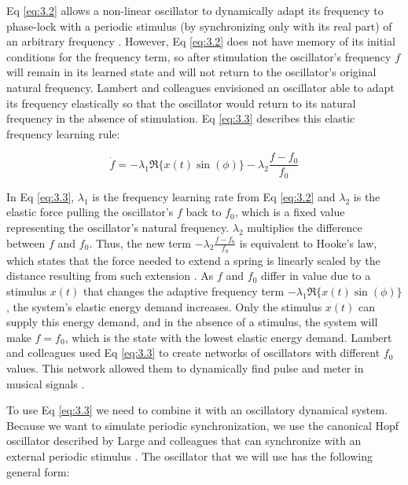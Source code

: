 \documentclass{report}
\begin{document}
Eq \eqref{eq:3.2} allows a non-linear oscillator to dynamically adapt its frequency to phase-lock with a periodic stimulus (by synchronizing only with its real part) of an arbitrary frequency \cite{righetti2006dynamic}. However, Eq \eqref{eq:3.2} does not have memory of its initial conditions for the frequency term, so after stimulation the oscillator's frequency $f$ will remain in its learned state and will not return to the oscillator's original natural frequency. Lambert and colleagues \cite{lambert2016adaptive} envisioned an oscillator able to adapt its frequency elastically so that the oscillator would return to its natural frequency in the absence of stimulation. Eq \eqref{eq:3.3} describes this elastic frequency learning rule:

\begin{equation}
\dot{f} = -\lambda_1 \Re \{ x(t) \sin(\phi) \} - \lambda_2 \frac{f-f_0}{f_0} \label{eq:3.3}
\end{equation}

In Eq \eqref{eq:3.3}, $\lambda_1$ is the frequency learning rate from Eq \eqref{eq:3.2} and $\lambda_2$ is the elastic force pulling the oscillator's $f$ back to $f_0$, which is a fixed value representing the oscillator's natural frequency. $\lambda_2$ multiplies the difference between $f$ and $f_0$. Thus, the new term $−\lambda_2 \frac{f-f_0}{f_0}$ is equivalent to Hooke's law, which states that the force needed to extend a spring is linearly scaled by the distance resulting from such extension \cite{lambert2016adaptive}. As $f$ and $f_0$ differ in value due to a stimulus $x(t)$ that changes the adaptive frequency term $-\lambda_1 \Re \{ x(t) \sin(\phi) \}$, the system's elastic energy demand increases. Only the stimulus $x(t)$ can supply this energy demand, and in the absence of a stimulus, the system will make $f = f_0$, which is the state with the lowest elastic energy demand. Lambert and colleagues \cite{lambert2016adaptive} used Eq \eqref{eq:3.3} to create networks of oscillators with different $f_0$ values. This network allowed them to dynamically find pulse and meter in musical signals \cite{lambert2016adaptive}.

To use Eq \eqref{eq:3.3} we need to combine it with an oscillatory dynamical system. Because we want to simulate periodic synchronization, we use the canonical Hopf oscillator described by Large and colleagues that can synchronize with an external periodic stimulus \cite{large2010canonical, kim2015signal}. The oscillator that we will use has the following general form:
\end{document}
